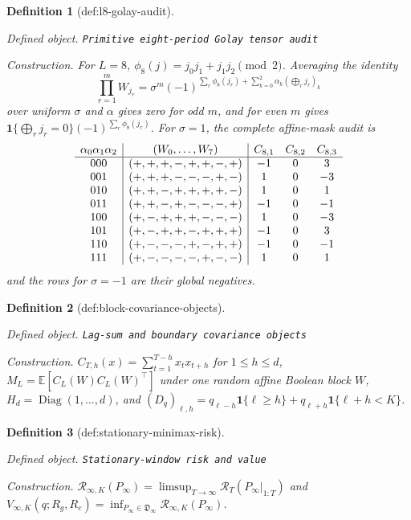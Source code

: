 \documentclass{article}
\newtheorem{definition}{Definition}
\begin{document}
\begin{definition}[def:l8-golay-audit]\label{def:l8-golay-audit}
\par\smallskip\noindent\emph{Defined object.} \texttt{Primitive eight-\allowbreak{}period Golay tensor audit}
\par\smallskip\noindent\emph{Construction.} For \(L=8\), \(\phi_8(j)=j_0j_1+j_1j_2\pmod 2\). Averaging the identity \[\prod_{r=1}^{m}W_{j_r}=\sigma^m(-1)^{\sum_r\phi_8(j_r)+\sum_{k=0}^{2}\alpha_k(\bigoplus_r j_r)_k}\] over uniform \(\sigma\) and \(\alpha\) gives zero for odd \(m\), and for even \(m\) gives \(\mathbf 1\{\bigoplus_rj_r=0\}(-1)^{\sum_r\phi_8(j_r)}\). For \(\sigma=1\), the complete affine-mask audit is \[\begin{array}{c|c|c c c}\alpha_0\alpha_1\alpha_2&(W_0,\ldots,W_7)&C_{8,1}&C_{8,2}&C_{8,3}\\\hline000&(+,+,+,-,+,+,-,+)&-1&0&3\\001&(+,+,+,-,-,-,+,-)&1&0&-3\\010&(+,+,-,+,+,+,+,-)&1&0&1\\011&(+,+,-,+,-,-,-,+)&-1&0&-1\\100&(+,-,+,+,+,-,-,-)&1&0&-3\\101&(+,-,+,+,-,+,+,+)&-1&0&3\\110&(+,-,-,-,+,-,+,+)&-1&0&-1\\111&(+,-,-,-,-,+,-,-)&1&0&1\end{array}\] and the rows for \(\sigma=-1\) are their global negatives.
\end{definition}

\begin{definition}[def:block-covariance-objects]\label{def:block-covariance-objects}
\par\smallskip\noindent\emph{Defined object.} \texttt{Lag-\allowbreak{}sum and boundary covariance objects}
\par\smallskip\noindent\emph{Construction.} \(C_{T,h}(x)=\sum_{t=1}^{T-h}x_tx_{t+h}\) for \(1\le h\le d\), \(M_L=\mathbb E[C_L(W)C_L(W)^{\top}]\) under one random affine Boolean block \(W\), \(H_d=\operatorname{Diag}(1,\ldots,d)\), and \((D_q)_{\ell,h}=q_{\ell-h}\mathbf 1\{\ell\ge h\}+q_{\ell+h}\mathbf 1\{\ell+h<K\}\).
\end{definition}

\begin{definition}[def:stationary-minimax-risk]\label{def:stationary-minimax-risk}
\par\smallskip\noindent\emph{Defined object.} \texttt{Stationary-\allowbreak{}window risk and value}
\par\smallskip\noindent\emph{Construction.} \(\mathcal R_{\infty,K}(P_{\infty})=\limsup_{T\to\infty}\mathcal R_T(P_{\infty}|_{1:T})\) and \(V_{\infty,K}(q;R_g,R_e)=\inf_{P_{\infty}\in\mathfrak D_{\infty}}\mathcal R_{\infty,K}(P_{\infty})\).
\end{definition}
\end{document}
